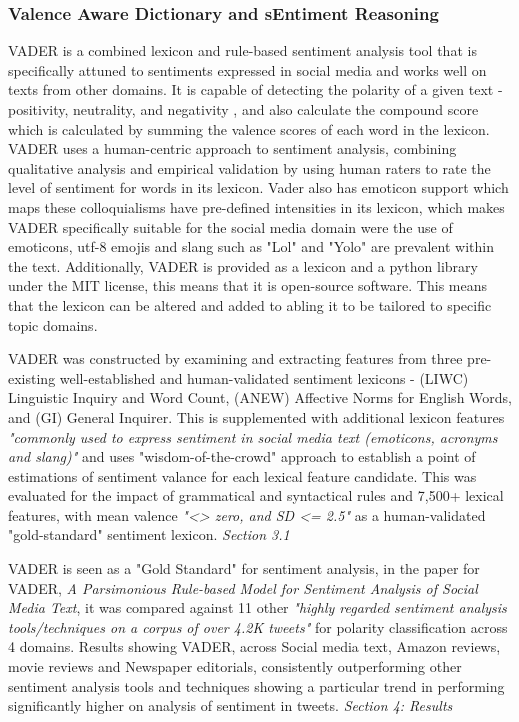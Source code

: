 \documentclass[oneside, 12pt]{article}
\begin{document}
			\subsubsection{Valence Aware Dictionary and sEntiment Reasoning}\label{Vader}
				VADER is a combined lexicon and rule-based sentiment analysis tool that is specifically attuned to sentiments expressed in social media and works well on texts from other domains. It is capable of detecting the polarity of a given text - positivity, neutrality, and negativity \cite{VADERPaper}, and also calculate the compound score which is calculated by summing the valence scores of each word in the lexicon. VADER uses a human-centric approach to sentiment analysis, combining qualitative analysis and empirical validation by using human raters to rate the level of sentiment for words in its lexicon. Vader also has emoticon support which maps these colloquialisms have pre-defined intensities in its lexicon, which makes VADER specifically suitable for the social media domain were the use of emoticons, utf-8 emojis and slang such as "Lol" and "Yolo" are prevalent within the text. Additionally, VADER is provided as a lexicon and a python library under the MIT license, this means that it is open-source software. This means that the lexicon can be altered and added to abling it to be tailored to specific topic domains. 
				
				VADER was constructed by examining and extracting features from three pre-existing well-established and human-validated sentiment lexicons \cite{VADERPaper} - (LIWC) Linguistic Inquiry and Word Count, (ANEW) Affective Norms for English Words, and (GI) General Inquirer. This is supplemented with additional lexicon features \textit{"commonly used to express sentiment in social media text (emoticons, acronyms and slang)"} \cite{VADERPaper} and uses "wisdom-of-the-crowd" approach \cite{WisCrowds} to establish a point of estimations of sentiment valance for each lexical feature candidate. This was evaluated for the impact of grammatical and syntactical rules and 7,500+ lexical features, with mean valence \textit{"<> zero, and SD <= 2.5"} as a human-validated "gold-standard" sentiment lexicon. \cite{VADERPaper}\textit{Section 3.1}
				
				VADER is seen as a "Gold Standard" for sentiment analysis, in the paper for VADER, \cite{VADERPaper} \textit{A Parsimonious Rule-based Model for Sentiment Analysis of Social Media Text}, it was compared against 11 other \textit{"highly regarded sentiment analysis tools/techniques on a corpus of over 4.2K tweets"} for polarity classification across 4 domains. Results showing VADER, across Social media text, Amazon reviews, movie reviews and Newspaper editorials, consistently outperforming other sentiment analysis tools and techniques showing a particular trend in performing significantly higher on analysis of sentiment in tweets. \cite{VADERPaper} \textit{Section 4: Results}
			
\end{document}
